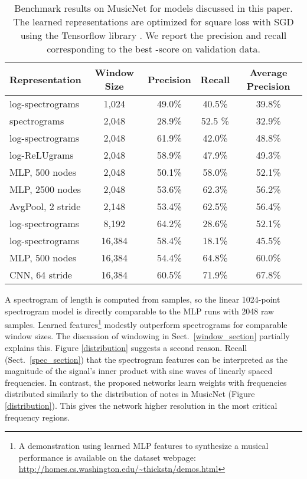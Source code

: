 \documentclass{article} \usepackage{iclr2017_conference,times}
\begin{document}
\begin{table}[h]
  \centering
  \begin{tabular}{lcccc}
    \toprule
    \cmidrule{1-5}
    Representation & Window Size & Precision & Recall & Average Precision \\
    \midrule
    log-spectrograms & 1,024 & 49.0\% & 40.5\% & 39.8\% \\
    spectrograms & 2,048 & 28.9\% & 52.5 \% & 32.9\% \\
    log-spectrograms & 2,048 & 61.9\% & 42.0\% & 48.8\% \\
    log-ReLUgrams & 2,048 & 58.9\% & 47.9\% & 49.3\% \\
    MLP, 500 nodes & 2,048 & 50.1\% & 58.0\% & 52.1\% \\
    MLP, 2500 nodes & 2,048 & 53.6\% & 62.3\% & 56.2\% \\
    AvgPool, 2 stride & 2,148 & 53.4\% & 62.5\% & 56.4\% \\
    log-spectrograms & 8,192 & 64.2\% & 28.6\% & 52.1\% \\
    log-spectrograms & 16,384 & 58.4\% & 18.1\% & 45.5\% \\
    MLP, 500 nodes & 16,384 & 54.4\% & 64.8\% & 60.0\% \\
    CNN, 64 stride & 16,384 & 60.5\% & 71.9\% & 67.8\% \\
    \bottomrule
  \end{tabular}
  \caption{Benchmark results on MusicNet for models discussed in this paper. The learned representations are optimized for square loss with SGD using the Tensorflow library \citep{tensorflow}. We report the precision and recall corresponding to the best -score on validation data.}
  \label{results}
\end{table}

A spectrogram of length  is computed from  samples, so the linear 1024-point spectrogram model is directly comparable to the MLP runs with 2048 raw samples. Learned features\footnote{A demonstration using learned MLP features to synthesize a musical performance is available on the dataset webpage: \url{http://homes.cs.washington.edu/~thickstn/demos.html}} modestly outperform spectrograms for comparable window sizes. The discussion of windowing in Sect.~\ref{window_section} partially explains this. Figure \ref{distribution} suggests a second reason. Recall (Sect.~\ref{spec_section}) that the spectrogram features can be interpreted as the magnitude of the signal's inner product with sine waves of linearly spaced frequencies. In contrast, the proposed networks learn weights with frequencies distributed similarly to the distribution of notes in MusicNet (Figure \ref{distribution}). This gives the network higher resolution in the most critical frequency regions.
\end{document}
